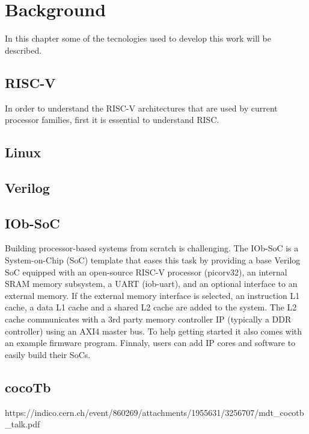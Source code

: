 \chapter{Background}
\label{chapter:background}

\quad In this chapter some of the tecnologies used to develop this work will be described.
\section{RISC-V}
\quad In order to understand the RISC-V architectures that are used by current processor families, first it is essential to understand RISC.

\section{Linux}

\section{Verilog}

\section{IOb-SoC}
\quad Building processor-based systems from scratch is challenging. The IOb-SoC is a System-on-Chip (SoC) template that eases this task by providing a base Verilog SoC equipped with an open-source RISC-V processor (picorv32), an internal SRAM memory subsystem, a UART (iob-uart), and an optional interface to an external memory. If the external memory interface is selected, an instruction L1 cache, a data L1 cache and a shared L2 cache are added to the system. The L2 cache communicates with a 3rd party memory controller IP (typically a DDR controller) using an AXI4 master bus. To help getting started it also comes with an example firmware program. Finnaly, users can add IP cores and software to easily build their SoCs.

\section{cocoTb}
https://indico.cern.ch/event/860269/attachments/1955631/3256707/mdt_cocotb_talk.pdf

\newpage
